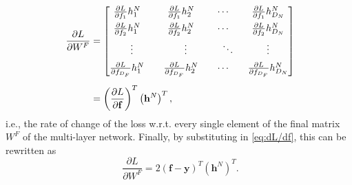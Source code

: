 \documentclass{article}
\newcommand{\pd}[0]{\phantom{.}}
\begin{document}
\begin{align}
    \phantom{,}\frac{\partial L}{\partial W^F} &=
    \begin{bmatrix}
        \frac{\partial L}{\partial f_1}h^N_1\quad &
        \frac{\partial L}{\partial f_1}h^N_2\quad &
        \cdots\quad &
        \frac{\partial L}{\partial f_1}h^N_{D_N} \\[0.5em]
        \frac{\partial L}{\partial f_2}h^N_1\quad &
        \frac{\partial L}{\partial f_2}h^N_2\quad &
        \cdots\quad &
        \frac{\partial L}{\partial f_2}h^N_{D_N} \\[0.5em]
        \vdots & \vdots & \ddots & \vdots \\[0.5em]
        \frac{\partial L}{\partial f_{D_F}}h^N_1\quad &
        \frac{\partial L}{\partial f_{D_F}}h^N_2\quad &
        \cdots\quad &
        \frac{\partial L}{\partial f_{D_F}}h^N_{D_N}
    \end{bmatrix}\notag \\[0.5em]
    &= \left(\frac{\partial L}{\partial \mathbf{f}}\right)^T\left(\mathbf{h}^N\right)^T,
\end{align}
i.e., the rate of change of the loss w.r.t. every single element of the final matrix $W^F$ of the multi-layer network. Finally, by substituting in \cref{eq:dL/df}, this can be rewritten as
\begin{equation}
    \pd\frac{\partial L}{\partial W^F} = 2(\mathbf{f} - \mathbf{y})^T\left(\mathbf{h}^N\right)^T.
\end{equation}
\end{document}
